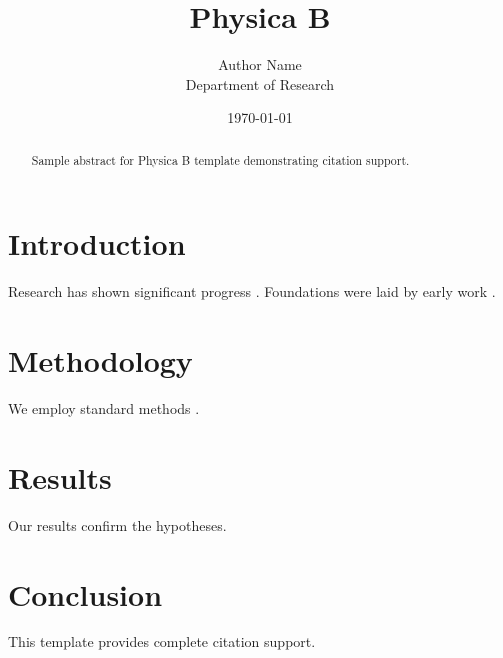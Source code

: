 ﻿\documentclass{elsarticle}
\title{Physica B}
\author{Author Name \\ \small Department of Research}
\date{\today}
\begin{document}
\maketitle

\begin{abstract}
Sample abstract for Physica B template demonstrating citation support.
\end{abstract}

\section{Introduction}
Research has shown significant progress \citep{einstein1905}. Foundations were laid by early work \citep{turing1950}.

\section{Methodology}
We employ standard methods \citep{knuth1984}.

\section{Results}
Our results confirm the hypotheses.

\section{Conclusion}
This template provides complete citation support.



\end{document}
